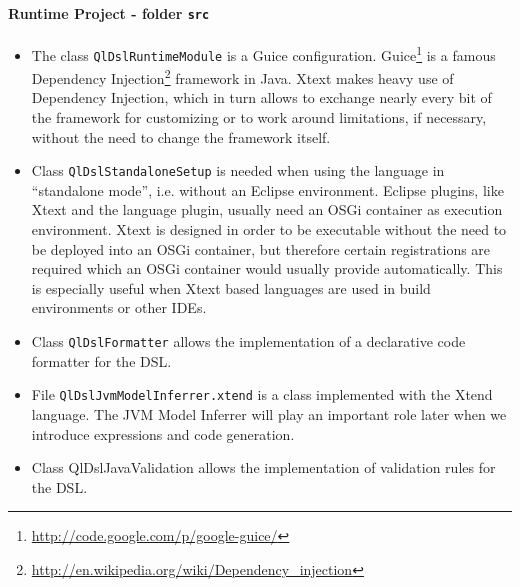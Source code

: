\paragraph{Runtime Project - folder \texttt{src}}
\begin{itemize}
\item The class \texttt{QlDslRuntimeModule} is a Guice configuration.
Guice\footnote{\url{http://code.google.com/p/google-guice/}} is a famous
Dependency Injection\footnote{\url{http://en.wikipedia.org/wiki/Dependency_injection}} framework in Java. 
Xtext makes heavy use of Dependency Injection, which in turn allows to exchange
nearly every bit of the framework for customizing or to work around limitations,
if necessary, without the need to change the framework itself.
\item Class \texttt{QlDslStandaloneSetup} is needed when using the language in
``standalone mode'', i.e. without an Eclipse environment. Eclipse plugins, like
Xtext and the language plugin, usually need an OSGi container as execution
environment. Xtext is designed in order to be executable without the need to be
deployed into an OSGi container, but therefore certain registrations are
required which an OSGi container would usually provide automatically. This is
especially useful when Xtext based languages are used in build environments or
other IDEs.
\item Class \texttt{QlDslFormatter} allows the implementation of a declarative
code formatter for the DSL.
\item File \texttt{QlDslJvmModelInferrer.xtend} is a class implemented with the
Xtend language. The JVM Model Inferrer will play an important role later when we
introduce expressions and code generation.
\item Class QlDslJavaValidation allows the implementation of validation rules
for the DSL.
\end{itemize}


